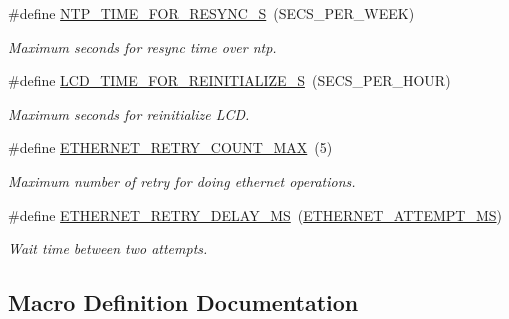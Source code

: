 \begin{DoxyCompactItemize}
\mbox{\label{rmap-config_8h_ac26c9e27fc41a5f7c43968b47b2d8cfc}} 
\#define \hyperlink{rmap-config_8h_ac26c9e27fc41a5f7c43968b47b2d8cfc}{N\+T\+P\+\_\+\+T\+I\+M\+E\+\_\+\+F\+O\+R\+\_\+\+R\+E\+S\+Y\+N\+C\+\_\+S}~(S\+E\+C\+S\+\_\+\+P\+E\+R\+\_\+\+W\+E\+EK)
\begin{DoxyCompactList}\small\item\em Maximum seconds for resync time over ntp. \end{DoxyCompactList}\item 
\mbox{\label{rmap-config_8h_af546d356bff5c682bba4aeeed199d5df}} 
\#define \hyperlink{rmap-config_8h_af546d356bff5c682bba4aeeed199d5df}{L\+C\+D\+\_\+\+T\+I\+M\+E\+\_\+\+F\+O\+R\+\_\+\+R\+E\+I\+N\+I\+T\+I\+A\+L\+I\+Z\+E\+\_\+S}~(S\+E\+C\+S\+\_\+\+P\+E\+R\+\_\+\+H\+O\+UR)
\begin{DoxyCompactList}\small\item\em Maximum seconds for reinitialize L\+CD. \end{DoxyCompactList}\item 
\mbox{\label{rmap-config_8h_a743e7905c81f2b5b6bb32fc55a3c5494}} 
\#define \hyperlink{rmap-config_8h_a743e7905c81f2b5b6bb32fc55a3c5494}{E\+T\+H\+E\+R\+N\+E\+T\+\_\+\+R\+E\+T\+R\+Y\+\_\+\+C\+O\+U\+N\+T\+\_\+\+M\+AX}~(5)
\begin{DoxyCompactList}\small\item\em Maximum number of retry for doing ethernet operations. \end{DoxyCompactList}\item 
\mbox{\label{rmap-config_8h_aad84a5cc78471bbe08ae9b0f519866ea}} 
\#define \hyperlink{rmap-config_8h_aad84a5cc78471bbe08ae9b0f519866ea}{E\+T\+H\+E\+R\+N\+E\+T\+\_\+\+R\+E\+T\+R\+Y\+\_\+\+D\+E\+L\+A\+Y\+\_\+\+MS}~(\hyperlink{ethernet__config_8h_a33ddf6002b3cabe6872997f10ce52a3b}{E\+T\+H\+E\+R\+N\+E\+T\+\_\+\+A\+T\+T\+E\+M\+P\+T\+\_\+\+MS})
\begin{DoxyCompactList}\small\item\em Wait time between two attempts. \end{DoxyCompactList}\end{DoxyCompactItemize}


\subsection{Macro Definition Documentation}
\mbox{\label{rmap-config_8h_a983c9777673ee873f12ec9f489215321}} 
